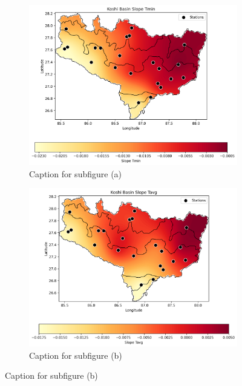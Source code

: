 \begin{figure}[htbp]
  \centering
  \begin{subfigure}{0.45\textwidth}
      \centering
      \includegraphics[width=\linewidth]{images/avg_krig_Koshi Basin Slope Tmin.png}
      \caption{Caption for subfigure (a)}
      \label{fig:7a}
  \end{subfigure}
  \hfill
  \begin{subfigure}{0.45\textwidth}
      \centering
      \includegraphics[width=\linewidth]{images/avg_krig_Koshi Basin Slope Tavg.png}
      \caption{Caption for subfigure (b)}
      \label{fig:7b}
  \end{subfigure}
  

\end{figure}
